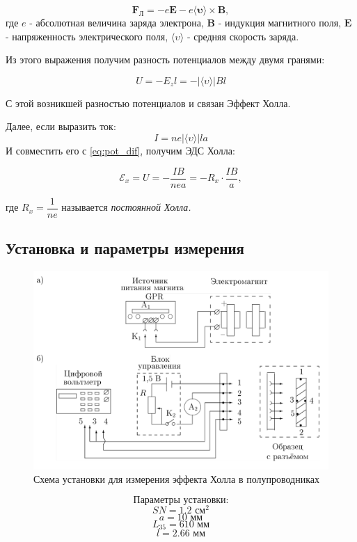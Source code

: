 \documentclass[a4paper, 12pt]{article}
\begin{document}
$$\boldsymbol{F_\text{Л}}  = -e \boldsymbol{E} - e \langle \boldsymbol{\upsilon} \rangle \times \boldsymbol{B},$$
где $e$ - абсолютная величина заряда электрона, $\boldsymbol{B}$ - индукция магнитного поля, $\boldsymbol{E}$ - напряженность электрического поля, $ \langle \upsilon \rangle$ - средняя скорость заряда.

Из этого выражения получим разность потенциалов между двумя гранями:

\begin{equation}
U = -E_zl = - | \langle \upsilon \rangle | B l
\label{eq:pot_dif}
\end{equation}

С этой возникшей разностью потенциалов и связан Эффект Холла.

Далее, если выразить ток:
$$ I = ne |\langle \upsilon \rangle |  l a$$
И совместить его с \ref{eq:pot_dif}, получим ЭДС Холла:

\begin{equation}
\mathscr{E}_x = U = - \dfrac{IB}{nea} = -R_x \cdot \dfrac{IB}{a},
\label{eq: Hall}
\end{equation}

где $R_x = \dfrac{1}{ne}$ называется \textit{постоянной Холла.}

\subsection*{Установка и параметры измерения}

\begin{figure}
\includegraphics[width = 0.7 \textwidth]{Scheme1}
			\caption{Схема установки для измерения эффекта Холла в полупроводниках}
\end{figure} 

		$$\text{Параметры установки:}$$
$$SN  = 1.2 \text{ см}^2$$
$$a = 10 \text{ мм}$$
$$L_{35} = 610 \text{ мм}$$
$$l = 2.66 \text{ мм}$$
\vspace{5 cm}
\end{document}

